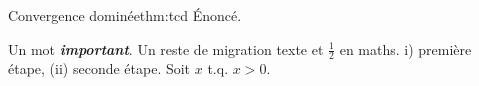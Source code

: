 \begin{theorem}{Convergence dominée}{thm:tcd} %
  Énoncé.
\end{theorem}
Un mot \emph{\textbf{important}}. %
Un reste de migration {{texte}} et $\frac{1}{{2}}$ en maths. %
 i) première étape, %
 (ii) seconde étape. %
Soit $x$ t.q. $x > 0$. %
\vspace{1em} %
\medskip %
